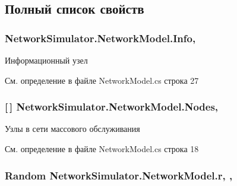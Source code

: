 \subsection{Полный список свойств}
\subsubsection[{\texorpdfstring{Info}{Info}}]{ Network\+Simulator.\+Network\+Model.\+Info\hspace{0.3cm}{\ttfamily [get]}, {}}\hypertarget{class_network_simulator_1_1_network_model_ad855627388c67befd2c4c736a87fa84d}{}\label{class_network_simulator_1_1_network_model_ad855627388c67befd2c4c736a87fa84d}


Информационный узел 



См. определение в файле Network\+Model.\+cs строка 27

\subsubsection[{\texorpdfstring{Nodes}{Nodes}}]{ \mbox{[}$\,$\mbox{]} Network\+Simulator.\+Network\+Model.\+Nodes\hspace{0.3cm}{\ttfamily [get]}, {}}\hypertarget{class_network_simulator_1_1_network_model_a822a8596ab343f9a22006035fdaf4b6f}{}\label{class_network_simulator_1_1_network_model_a822a8596ab343f9a22006035fdaf4b6f}


Узлы в сети массового обслуживания 



См. определение в файле Network\+Model.\+cs строка 18

\subsubsection[{\texorpdfstring{r}{r}}]{\setlength{\rightskip}{0pt plus 5cm}Random Network\+Simulator.\+Network\+Model.\+r\hspace{0.3cm}{\ttfamily [get]}, {\ttfamily [set]}, {\ttfamily [private]}}\hypertarget{class_network_simulator_1_1_network_model_aaeac879328213fb50bce2e4c44368ecf}{}\label{class_network_simulator_1_1_network_model_aaeac879328213fb50bce2e4c44368ecf}


